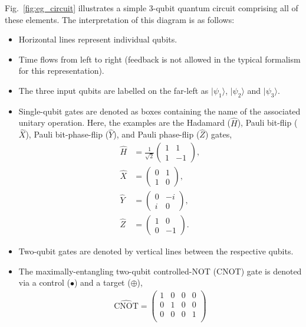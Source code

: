 \documentclass[aps, rmp, twocolumn, amsmath, amssymb, nofootinbib, superscriptaddress, longbibliography, floatfix, table-of-contents, eqsecnum]{revtex4-1}
\newcommand{\ket}[1]{|#1\rangle}
\begin{document}
Fig.~\ref{fig:eg_circuit} illustrates a simple 3-qubit quantum circuit comprising all of these elements. The interpretation of this diagram is as follows:
\begin{itemize}
	\item Horizontal lines represent individual qubits.
	\item Time flows from left to right (feedback is not allowed in the typical formalism for this representation).
	\item The three input qubits are labelled on the far-left as $\ket{\psi_1}$, $\ket{\psi_2}$ and $\ket{\psi_3}$.
	\item Single-qubit gates are denoted as boxes containing the name of the associated unitary operation. Here, the examples are the Hadamard ($\hat{H}$), Pauli bit-flip ($\hat{X}$), Pauli bit-phase-flip ($\hat{Y}$), and Pauli phase-flip ($\hat{Z}$) gates,
	\begin{align}
		\hat{H} &= \frac{1}{\sqrt{2}}\begin{pmatrix}
		1 & 1 \\
		1 & -1
		\end{pmatrix},\nonumber \\
		\hat{X} &= \begin{pmatrix}
		0 & 1 \\
		1 & 0
		\end{pmatrix},\nonumber \\
		\hat{Y} &= \begin{pmatrix}
		0 & -i \\
		i & 0
		\end{pmatrix},\nonumber \\
		\hat{Z} &= \begin{pmatrix}
		1 & 0 \\
		0 & -1
		\end{pmatrix}.
	\end{align}
	\item Two-qubit gates are denoted by vertical lines between the respective qubits.
	\item The maximally-entangling two-qubit controlled-NOT (CNOT) gate is denoted via a control ($\bullet$) and a target ($\oplus$),
	\begin{align}
		\hat{\text{CNOT}}=\begin{pmatrix}
		1 & 0 & 0 & 0 \\
		0 & 1 & 0 & 0 \\
		0 & 0 & 0 & 1 \\

\end{pmatrix}
\end{align}
\end{itemize}
\end{document}
